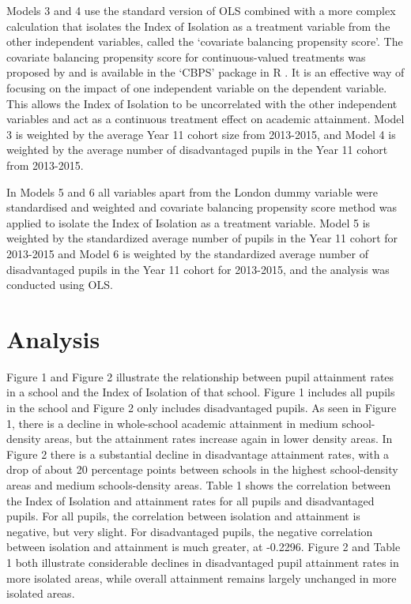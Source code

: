 \documentclass[12pt, a4paper]{article}
\begin{document}
Models 3 and 4 use the standard version of OLS combined with a more complex calculation that isolates the Index of Isolation as a treatment variable from the other independent variables, called the `covariate balancing propensity score'. The covariate balancing propensity score for continuous-valued treatments was proposed by \textcite{fong2015} and is available in the `CBPS' package in R \autocites{fong2016}. It is an effective way of focusing on the impact of one independent variable on the dependent variable. This allows the Index of Isolation to be uncorrelated with the other independent variables and act as a continuous treatment effect on academic attainment. Model 3 is weighted by the average Year 11 cohort size from 2013-2015, and Model 4 is weighted by the average number of disadvantaged pupils in the Year 11 cohort from 2013-2015.

In Models 5 and 6 all variables apart from the London dummy variable were standardised and weighted and  covariate balancing propensity score method was applied to isolate the Index of Isolation as a treatment variable. Model 5 is weighted by the standardized average number of pupils in the Year 11 cohort for 2013-2015 and Model 6 is weighted by the standardized average number of disadvantaged pupils in the Year 11 cohort for 2013-2015, and the analysis was conducted using OLS.

\section{Analysis}

Figure 1 and Figure 2 illustrate the relationship between pupil attainment rates in a school and the Index of Isolation of that school. Figure 1 includes all pupils in the school and Figure 2 only includes disadvantaged pupils. As seen in Figure 1, there is a decline in whole-school academic attainment in medium school-density areas, but the attainment rates increase again in lower density areas. In Figure 2 there is a substantial decline in disadvantage attainment rates, with a drop of about 20 percentage points between schools in the highest school-density areas and medium schools-density areas. Table 1 shows the correlation between the Index of Isolation and attainment rates for all pupils and disadvantaged pupils. For all pupils, the correlation between isolation and attainment is negative, but very slight. For disadvantaged pupils, the negative correlation between isolation and attainment is much greater, at -0.2296. Figure 2 and Table 1 both illustrate considerable declines in disadvantaged pupil attainment rates in more isolated areas, while overall attainment remains largely unchanged in more isolated areas.
\end{document}

